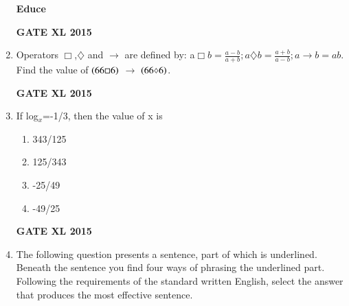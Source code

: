 \documentclass[journal,12pt,onecolumn]{IEEEtran}
\begin{document}
\begin{enumerate}
	\textbf{Educe}
    \begin{enumerate}
    \end{enumerate}
\begin{flushright}\textbf{GATE XL 2015}\end{flushright}
\item Operators $\Box$,$\diamondsuit$ and $\rightarrow$ are defined by: a$\Box b=\frac{a-b}{a+b};a \diamondsuit b = \frac{a+b}{a-b};a\rightarrow b = ab$. Find the value of $\left(66\Box6\right)$ $\rightarrow$ $ \left(66\diamondsuit6\right)$.
    \begin{enumerate}
    \end{enumerate}
\begin{flushright}\textbf{GATE XL 2015}\end{flushright}
\item If log$_x$=-1/3, then the value of x is
    \begin{enumerate}
            \item 343/125
            \item 125/343
            \item -25/49
            \item -49/25
    \end{enumerate}
\begin{flushright}\textbf{GATE XL 2015}\end{flushright}
\item The following question presents a sentence, part of which is underlined. Beneath the sentence you find four ways of phrasing the underlined part. Following the requirements of the standard written English, select the answer that produces the most effective sentence.


\end{enumerate}
\end{document}
